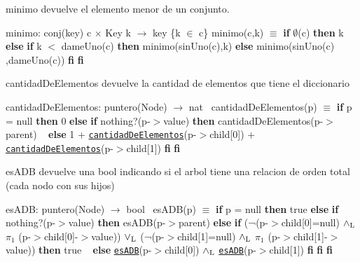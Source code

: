 \begin{DoxyParagraph}{minimo}
devuelve el elemento menor de un conjunto.

minimo\+: conj(key) c $\times$ Key k $\to$ key \{k $\in$ c\} minimo(c,k) $\equiv$ {\bfseries if} $\emptyset$(c) {\bfseries then} k {\bfseries else} {\bfseries if} k $<$ dame\+Uno(c) {\bfseries then} minimo(sin\+Uno(c),k) {\bfseries else} minimo(sin\+Uno(c) ,dame\+Uno(c)) {\bfseries fi} {\bfseries fi} 
\end{DoxyParagraph}


\begin{DoxyParagraph}{cantidad\+De\+Elementos}
devuelve la cantidad de elementos que tiene el diccionario

cantidad\+De\+Elementos\+: puntero(\+Node) $\to$ nat~\newline
 cantidad\+De\+Elementos(p) $\equiv$ {\bfseries if} p = null {\bfseries then} 0 {\bfseries else} {\bfseries if} nothing?(p-\/$>$value) {\bfseries then} cantidad\+De\+Elementos(p-\/$>$parent) ~\newline
 {\bfseries else} 1 + \href{axiomas.html#cantidadDeElementos}{\tt cantidad\+De\+Elementos}(p-\/$>$child\mbox{[}0\mbox{]}) + \href{axiomas.html#cantidadDeElementos}{\tt cantidad\+De\+Elementos}(p-\/$>$child\mbox{[}1\mbox{]}) {\bfseries fi} {\bfseries fi} 
\end{DoxyParagraph}


\begin{DoxyParagraph}{es\+A\+DB}
devuelve una bool indicando si el arbol tiene una relacion de orden total (cada nodo con sus hijos)

es\+A\+DB\+: puntero(\+Node) $\to$ bool~\newline
 es\+A\+D\+B(p) $\equiv$ {\bfseries if} p = null {\bfseries then} true {\bfseries else} {\bfseries if} nothing?(p-\/$>$value) {\bfseries then} es\+A\+DB(p-\/$>$parent) {\bfseries else} {\bfseries if} (¬(p-\/$>$child\mbox{[}0\mbox{]}=null) $\land_{\rm L}$ $\pi_1$ (p-\/$>$child\mbox{[}0\mbox{]}-\/$>$value)) $\lor_{\rm L}$ (¬(p-\/$>$child\mbox{[}1\mbox{]}=null) $\land_{\rm L}$ $\pi_1$ (p-\/$>$child\mbox{[}1\mbox{]}-\/$>$value)) {\bfseries then} true ~\newline
 {\bfseries else} \href{axiomas.html#esADB}{\tt es\+A\+DB}(p-\/$>$child\mbox{[}0\mbox{]}) $\land_{\rm L}$ \href{axiomas.html#esADB}{\tt es\+A\+DB}(p-\/$>$child\mbox{[}1\mbox{]}) {\bfseries fi} {\bfseries fi} {\bfseries fi} 
\end{DoxyParagraph}



